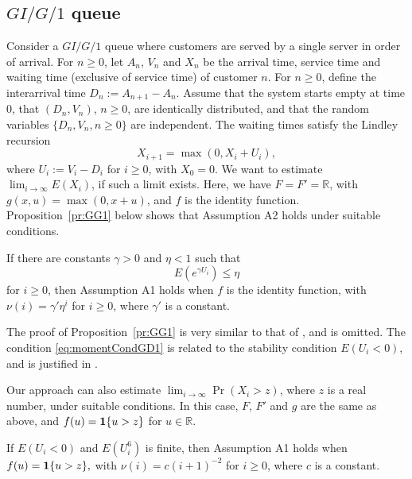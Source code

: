 \documentclass[a4paper,11pt]{article}
\begin{document}
 \subsection{\(GI/G/1\) queue}\label{sub:GIG1example}
 Consider  a  \(GI/G/1\) queue
 where   customers are served by a single server in order of arrival.  For \(n\geq0\), let \(A_{n}\), \(V_{n}\) and \(X_{n}\) be the arrival time, service time and waiting time (exclusive of service time) of customer \(n\).    For \(n\geq0\), define the interarrival time  \(D_{n}:=A_{n+1}-A_{n}\). Assume that the system starts empty at time \(0\), that   \((D_{n},V_{n})\), \(n\geq0\), are identically distributed, and that the random variables \(\{D_{n},V_{n},n\geq0\}\) are independent.
The waiting times satisfy the Lindley recursion \cite[p.1]{asmussenGlynn2007} \begin{equation*}
X_{i+1}=\max(0,X_i+U_{i}),
\end{equation*}where \(U_{i}:=V_i-D_{i}\) for \(i\geq0\), with \(X_{0}=0\). We want to estimate \(\lim_{i\rightarrow\infty}E(X_{i})\), if such a limit exists. Here, we have \(F=F'=\mathbb{R}\), with \(g(x,u)=\max(0,x+u)\), and   \(f\) is the identity function. 
Proposition~\ref{pr:GG1} below shows that Assumption A2 holds under suitable  conditions. 
\begin{proposition}\label{pr:GG1}If  there are constants \(\gamma>0\) and \(\eta<1\) such that
\begin{equation}\label{eq:momentCondGD1}
E(e^{\gamma U_{i}})\leq\eta
\end{equation}  for \(i\ge0\), then Assumption A1 holds when   \(f\) is the identity function, with  \(\nu(i)= \gamma'\eta^{i}\)  for \(i\ge0\), where \(\gamma'\) is a constant. \end{proposition}
 The proof of Proposition~\ref{pr:GG1} is very similar to that of \cite[Proposition 10]{kahaRandomizedDimensionReduction20}, and is omitted. The condition  \eqref{eq:momentCondGD1} is related to the stability condition \(E(U_{i}<0)\), and is justified in \cite{kahaRandomizedDimensionReduction20}.  

Our approach can also  estimate \(\lim_{i\rightarrow\infty}\Pr(X_{i}> z)\), where  \(z\) is a real number, under suitable conditions. In this case, \(F\), \(F'\) and \(g\) are the same as above, and   \(f(u)={\bf1}\{u> z\}\) for \(u\in\mathbb{R}\).
 
\begin{proposition}\label{pr:GG1Binary}If \(E(U_{i}<0)\) and \(E(U_{i}^{6})\) is finite, then Assumption A1 holds when   \(f(u)={\bf1}\{u> z\},\)  with  \(\nu(i)=c(i+1)^{-2}\)  for \(i\ge0\), where \(c\) is a constant. \end{proposition}
\end{document}
